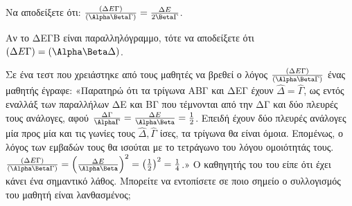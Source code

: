 \begin{alist}
\item
    \begin{rlist}
    \item Να αποδείξετε ότι: $\frac{(\Delta E \Gamma)}{(\Alpha \Beta \Gamma)} = \frac{\Delta E}{2 \Beta \Gamma}$. 
    \item Αν το ΔΕΓΒ είναι παραλληλόγραμμο, τότε να αποδείξετε ότι $(\Delta E \Gamma) = (\Alpha \Beta \Delta)$. 
    \end{rlist}
\item Σε ένα τεστ που χρειάστηκε από τους μαθητές να βρεθεί ο λόγος $\frac{(\Delta E \Gamma)}{(\Alpha \Beta \Gamma)}$ ένας μαθητής έγραφε: «Παρατηρώ ότι τα τρίγωνα ΑΒΓ και ΔΕΓ έχουν $\hat{\Delta} = \hat{\Gamma}$, ως εντός εναλλάξ των παραλλήλων ΔΕ και ΒΓ που τέμνονται από την ΔΓ και δύο πλευρές τους ανάλογες, αφού $\frac{\Delta \Gamma}{\Alpha \Gamma} = \frac{\Delta E}{\Alpha \Beta} = \frac{1}{2}$. Επειδή έχουν δύο πλευρές ανάλογες μία προς μία και τις γωνίες τους $\hat{\Delta}, \hat{\Gamma}$ ίσες, τα τρίγωνα θα είναι όμοια. Επομένως, ο λόγος των εμβαδών τους θα ισούται με το τετράγωνο του λόγου ομοιότητάς τους. $\frac{(\Delta E \Gamma)}{(\Alpha \Beta \Gamma)} = \left(\frac{\Delta E}{\Alpha \Beta}\right)^2 = \left(\frac{1}{2}\right)^2 = \frac{1}{4}$.» Ο καθηγητής του του είπε ότι έχει κάνει ένα σημαντικό λάθος. Μπορείτε να εντοπίσετε σε ποιο σημείο ο συλλογισμός του μαθητή είναι λανθασμένος; 
\end{alist}